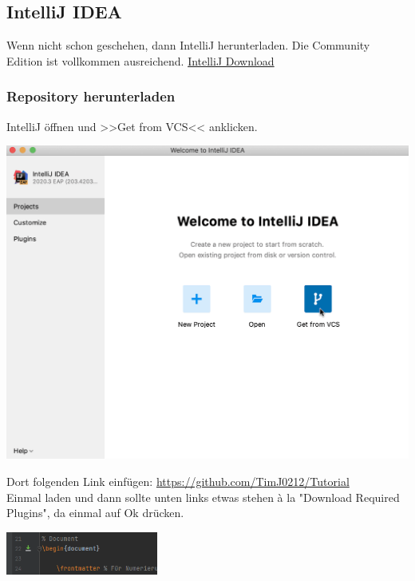 \documentclass[11pt]{article}
\begin{document}
    \subsection{IntelliJ IDEA}\label{subsec:intellij-idea}

    Wenn nicht schon geschehen, dann IntelliJ herunterladen.
    Die Community Edition ist vollkommen ausreichend.
    \href{https://www.jetbrains.com/idea/download/#section=windows}{IntelliJ Download}

    \subsubsection{Repository herunterladen}

    IntelliJ öffnen und >>Get from VCS<< anklicken. \\

    \begin{center}
        \includegraphics[width=\textwidth]{resources/intellij}
    \end{center}

    Dort folgenden Link einfügen: \underline{https://github.com/TimJ0212/Tutorial} \\

    Einmal laden und dann sollte unten links etwas stehen à la "Download Required Plugins", da einmal auf Ok drücken.

    \includegraphics[width=5cm]{resources/int-comp}
\end{document}
